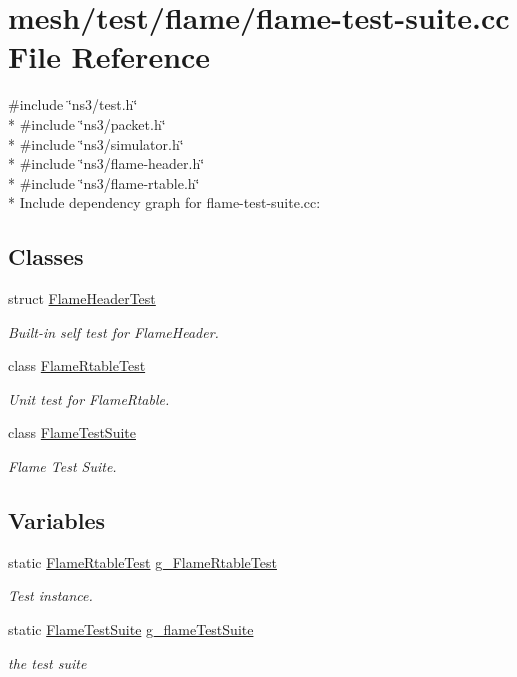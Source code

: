 \hypertarget{flame-test-suite_8cc}{}\section{mesh/test/flame/flame-\/test-\/suite.cc File Reference}
\label{flame-test-suite_8cc}
{\ttfamily \#include \char`\"{}ns3/test.\+h\char`\"{}}\\*
{\ttfamily \#include \char`\"{}ns3/packet.\+h\char`\"{}}\\*
{\ttfamily \#include \char`\"{}ns3/simulator.\+h\char`\"{}}\\*
{\ttfamily \#include \char`\"{}ns3/flame-\/header.\+h\char`\"{}}\\*
{\ttfamily \#include \char`\"{}ns3/flame-\/rtable.\+h\char`\"{}}\\*
Include dependency graph for flame-\/test-\/suite.cc\+:
\subsection*{Classes}
\begin{DoxyCompactItemize}
\item 
struct \hyperlink{structFlameHeaderTest}{Flame\+Header\+Test}
\begin{DoxyCompactList}\small\item\em Built-\/in self test for Flame\+Header. \end{DoxyCompactList}\item 
class \hyperlink{classFlameRtableTest}{Flame\+Rtable\+Test}
\begin{DoxyCompactList}\small\item\em Unit test for Flame\+Rtable. \end{DoxyCompactList}\item 
class \hyperlink{classFlameTestSuite}{Flame\+Test\+Suite}
\begin{DoxyCompactList}\small\item\em Flame Test Suite. \end{DoxyCompactList}\end{DoxyCompactItemize}
\subsection*{Variables}
\begin{DoxyCompactItemize}
\item 
static \hyperlink{classFlameRtableTest}{Flame\+Rtable\+Test} \hyperlink{flame-test-suite_8cc_a1b20715f3b0c4922dff634eb27e66408}{g\+\_\+\+Flame\+Rtable\+Test}
\begin{DoxyCompactList}\small\item\em Test instance. \end{DoxyCompactList}\item 
static \hyperlink{classFlameTestSuite}{Flame\+Test\+Suite} \hyperlink{flame-test-suite_8cc_a9f93b20499733ab6846f1168eb6c2f2b}{g\+\_\+flame\+Test\+Suite}
\begin{DoxyCompactList}\small\item\em the test suite \end{DoxyCompactList}\end{DoxyCompactItemize}


